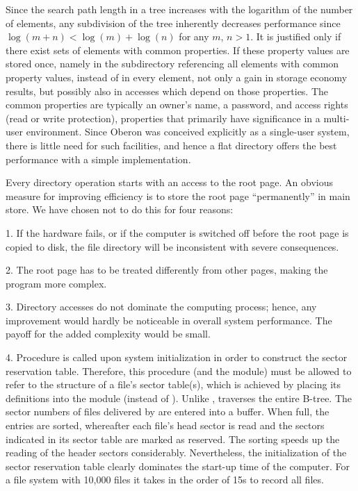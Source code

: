 Since the search path length in a tree increases with the logarithm of the number of elements, any subdivision of the tree inherently decreases performance since $\log{(m + n)} < \log{(m)} + \log{(n)}$ for any $m$, $n > 1$. It is justified only if there exist sets of elements with common properties. If these property values are stored once, namely in the subdirectory referencing all elements with common property values, instead of in every element, not only a gain in storage economy results, but possibly also in accesses which depend on those properties. The common properties are typically an owner's name, a password, and access rights (read or write protection), properties that primarily have significance in a multi-user environment. Since Oberon was conceived explicitly as a single-user system, there is little need for such facilities, and hence a flat directory offers the best performance with a simple implementation.

Every directory operation starts with an access to the root page. An obvious measure for improving efficiency is to store the root page ``permanently'' in main store. We have chosen not to do this for four reasons:

\item{1.} If the hardware fails, or if the computer is switched off before the root page is copied to disk, the file directory will be inconsistent with severe consequences.
\item{2.} The root page has to be treated differently from other pages, making the program more complex.
\item{3.} Directory accesses do not dominate the computing process; hence, any improvement would hardly be noticeable in overall system performance. The payoff for the added complexity would be small.
\item{4.} Procedure  is called upon system initialization in order to construct the sector reservation table. Therefore, this procedure (and the module) must be allowed to refer to the structure of a file's sector table(s), which is achieved by placing its definitions into the module  (instead of ). Unlike ,  traverses the entire B-tree. The sector numbers of files delivered by  are entered into a buffer. When full, the entries are sorted, whereafter each file's head sector is read and the sectors indicated in its sector table are marked as reserved. The sorting speeds up the reading of the header sectors considerably. Nevertheless, the initialization of the sector reservation table clearly dominates the start-up time of the computer. For a file system with 10,000 files it takes in the order of 15s to record all files.

